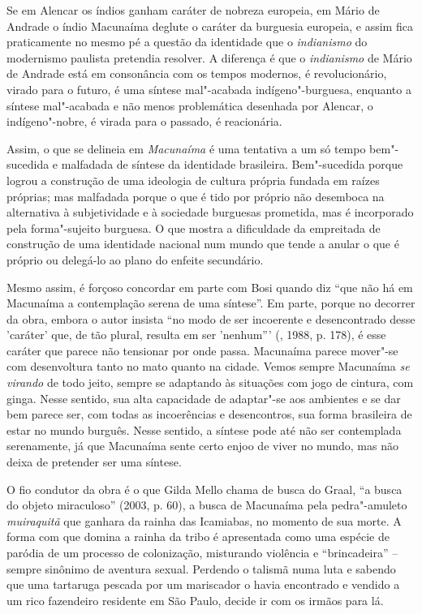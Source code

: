 Se em Alencar os índios ganham caráter de nobreza europeia, em Mário de
Andrade o índio Macunaíma deglute o caráter da burguesia europeia, e
assim fica praticamente no mesmo pé a questão da identidade que o
\emph{indianismo} do modernismo paulista pretendia resolver. A diferença
é que o \emph{indianismo} de Mário de Andrade está em consonância com os
tempos modernos, é revolucionário, virado para o futuro, é uma síntese
mal"-acabada indígeno"-burguesa, enquanto a síntese mal"-acabada e não
menos problemática desenhada por Alencar, o indígeno"-nobre, é virada
para o passado, é reacionária.

Assim, o que se delineia em \emph{Macunaíma} é uma tentativa a um só
tempo bem"-sucedida e malfadada de síntese da identidade brasileira.
Bem"-sucedida porque logrou a construção de uma ideologia de cultura
própria fundada em raízes próprias; mas malfadada porque o que é tido
por próprio não desemboca na alternativa à subjetividade e à sociedade
burguesas prometida, mas é incorporado pela forma"-sujeito burguesa. O
que mostra a dificuldade da empreitada de construção de uma identidade
nacional num mundo que tende a anular o que é próprio ou delegá-lo ao
plano do enfeite secundário.

Mesmo assim, é forçoso concordar em parte com Bosi quando diz ``que não
há em Macunaíma a contemplação serena de uma síntese''. Em parte, porque
no decorrer da obra, embora o autor insista ``no modo de ser incoerente
e desencontrado desse 'caráter' que, de tão plural, resulta em ser
'nenhum''' (, 1988, p. 178), é esse caráter que parece não tensionar
por onde passa. Macunaíma parece mover"-se com desenvoltura tanto no mato
quanto na cidade. Vemos sempre Macunaíma \emph{se virando} de todo
jeito, sempre se adaptando às situações com jogo de cintura, com ginga.
Nesse sentido, sua alta capacidade de adaptar"-se aos ambientes e se dar
bem parece ser, com todas as incoerências e desencontros, sua forma
brasileira de estar no mundo burguês. Nesse sentido, a síntese pode até
não ser contemplada serenamente, já que Macunaíma sente certo enjoo de
viver no mundo, mas não deixa de pretender ser uma síntese.

O fio condutor da obra é o que Gilda Mello chama de busca do Graal, ``a
busca do objeto miraculoso'' (2003, p. 60), a busca de Macunaíma pela
pedra"-amuleto \emph{muiraquitã} que ganhara da rainha das Icamiabas, no
momento de sua morte. A forma com que domina a rainha da tribo é
apresentada como uma espécie de paródia de um processo de colonização,
misturando violência e ``brincadeira'' -- sempre sinônimo de aventura
sexual. Perdendo o talismã numa luta e sabendo que uma tartaruga pescada
por um mariscador o havia encontrado e vendido a um rico fazendeiro
residente em São Paulo, decide ir com os irmãos para lá.


